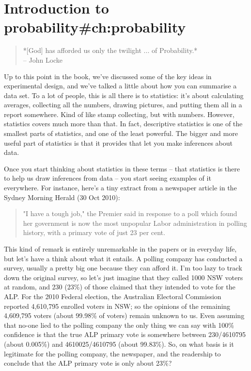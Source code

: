 

\chapter{Introduction to probability{#ch:probability}}

\begin{quote}
*[God] has afforded us only the twilight ... of Probability.* \\
\hspace*{2cm} -- John Locke
\end{quote}
\vspace*{12pt}


Up to this point in the book, we've discussed some of the key ideas in experimental design, and we've talked a little about how you can summarise a data set.  To a lot of people, this is all there is to statistics: it's about calculating averages, collecting all the numbers, drawing pictures, and putting them all in a report somewhere. Kind of like stamp collecting, but with numbers. However, statistics covers much more than that. In fact, descriptive statistics is one of the smallest parts of statistics, and one of the least powerful. The bigger and more useful part of statistics is that it provides that let you make inferences about data. 

Once you start thinking about statistics in these terms -- that statistics is there to help us draw inferences from data -- you start seeing examples of it everywhere. For instance, here's a tiny extract from a newspaper article in the Sydney Morning Herald (30 Oct 2010):
\small
\begin{quote}
"I have a tough job," the Premier said in response to a poll which found her government is now the most unpopular Labor administration in polling history, with a primary vote of just 23 per cent.
\end{quote}
\normalsize
This kind of remark is entirely unremarkable in the papers or in everyday life, but let's have a think about what it entails. A polling company has conducted a survey, usually a pretty big one because they can afford it. I'm too lazy to track down the original survey, so let's just imagine that they called 1000 NSW voters at random, and 230 (23\%) of those claimed that they intended to vote for the ALP. For the 2010 Federal election, the Australian Electoral Commission reported 4,610,795 enrolled voters in NSW; so the opinions of the remaining 4,609,795 voters (about 99.98\% of voters) remain unknown to us. Even assuming that no-one lied to the polling company the only thing we can say with 100\% confidence is that the true ALP primary vote is somewhere between 230/4610795 (about 0.005\%) and 4610025/4610795 (about 99.83\%). So, on what basis is it legitimate for the polling company, the newspaper, and the readership to conclude that the ALP primary vote is only about 23\%?

